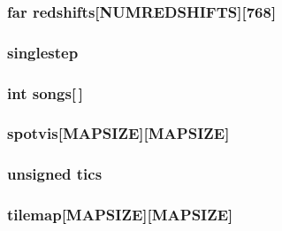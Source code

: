 \label{WL__PLAY_8C_a7bc9cfbaebb2f8731fc6a008d5e02bff}
\hypertarget{WL__PLAY_8C_a9662d2ac7202ad45530f94f43124fef1}{
\subsubsection[{redshifts}]{ far {\bf redshifts}\mbox{[}NUMREDSHIFTS\mbox{]}\mbox{[}768\mbox{]}}}
\label{WL__PLAY_8C_a9662d2ac7202ad45530f94f43124fef1}
\hypertarget{WL__PLAY_8C_a46d81099af6d10af477bc30272a05919}{
\subsubsection[{singlestep}]{ {\bf singlestep}}}
\label{WL__PLAY_8C_a46d81099af6d10af477bc30272a05919}
\hypertarget{WL__PLAY_8C_a4af95f8ed94849394a922f8dab8c1dd7}{
\subsubsection[{songs}]{\setlength{\rightskip}{0pt plus 5cm}int {\bf songs}\mbox{[}$\,$\mbox{]}}}
\label{WL__PLAY_8C_a4af95f8ed94849394a922f8dab8c1dd7}
\hypertarget{WL__PLAY_8C_a4d17a83d6ebae084e33130e818311b0f}{
\subsubsection[{spotvis}]{ {\bf spotvis}\mbox{[}MAPSIZE\mbox{]}\mbox{[}MAPSIZE\mbox{]}}}
\label{WL__PLAY_8C_a4d17a83d6ebae084e33130e818311b0f}
\hypertarget{WL__PLAY_8C_a2b5fccfe4a509a1a5f685bb7b7399997}{
\subsubsection[{tics}]{\setlength{\rightskip}{0pt plus 5cm}unsigned {\bf tics}}}
\label{WL__PLAY_8C_a2b5fccfe4a509a1a5f685bb7b7399997}
\hypertarget{WL__PLAY_8C_a71276ae4f97677e43033f2f6103b8720}{
\subsubsection[{tilemap}]{ {\bf tilemap}\mbox{[}MAPSIZE\mbox{]}\mbox{[}MAPSIZE\mbox{]}}}
